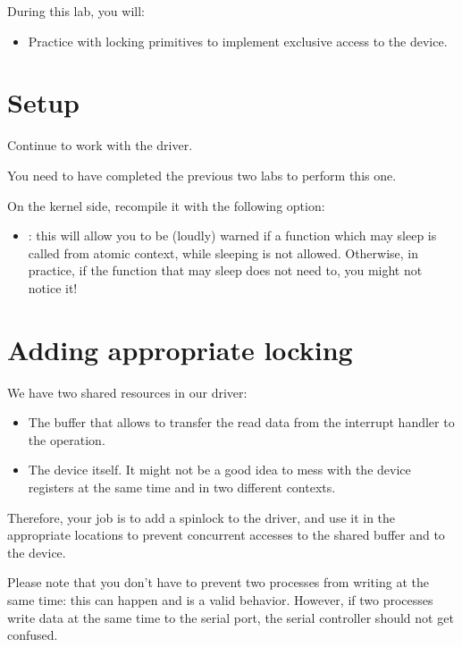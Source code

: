 
During this lab, you will:

\begin{itemize}
\item Practice with locking primitives to implement exclusive access
  to the device.
\end{itemize}

\section{Setup}

Continue to work with the  driver.

You need to have completed the previous two labs to perform this one.

On the kernel side, recompile it with the following option:

\begin{itemize}
\item {}: this will allow you to be
  (loudly) warned if a function which may sleep is called from atomic
  context, while sleeping is not allowed. Otherwise, in practice, if the
  function that may sleep does not need to, you might not notice it!
\end{itemize}

\section{Adding appropriate locking}

We have two shared resources in our driver:
\begin{itemize}

\item The buffer that allows to transfer the read data from the
  interrupt handler to the  operation.

\item The device itself. It might not be a good idea to mess with the
  device registers at the same time and in two different contexts.

\end{itemize}

Therefore, your job is to add a spinlock to the driver, and use it in
the appropriate locations to prevent concurrent accesses to the shared
buffer and to the device.

Please note that you don't have to prevent two processes from writing
at the same time: this can happen and is a valid behavior. However, if
two processes write data at the same time to the serial port, the
serial controller should not get confused.

